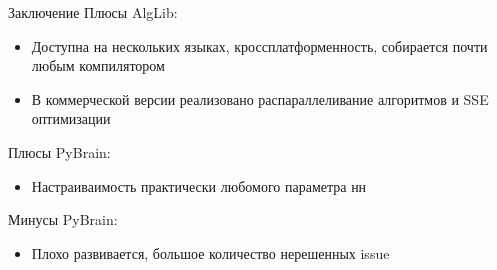 \documentclass{beamer}
\begin{document}
\begin{frame}{Заключение}
    Плюсы AlgLib:
    \begin{itemize}
        \item Доступна на нескольких языках, кроссплатформенность, собирается
            почти любым компилятором
        \item В коммерческой версии реализовано распараллеливание алгоритмов и
            SSE оптимизации
    \end{itemize}
    Плюсы PyBrain:
    \begin{itemize}
        \item Настраиваимость практически любомого параметра нн
    \end{itemize}
    Минусы PyBrain:
    \begin{itemize}
        \item Плохо развивается, большое количество нерешенных issue
    \end{itemize}
\end{frame}
\end{document}
